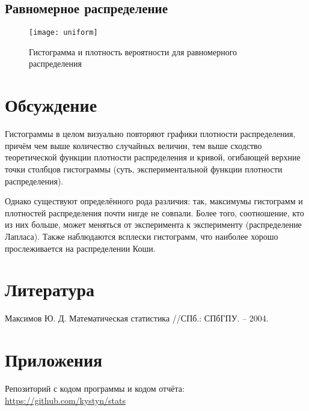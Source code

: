 \subsection{Равномерное распределение}
\begin{figure}[H]
	\begin{center}
		\texttt{[image: uniform]}
		\caption{Гистограмма и плотность вероятности для равномерного распределения} 
		\label{pic:pic_name}
	\end{center}
\end{figure}


\section{Обсуждение}
Гистограммы в целом визуально повторяют графики плотности распределения, причём чем выше количество случайных величин, тем выше сходство теоретической функции плотности распределения и кривой, огибающей верхние точки столбцов гистограммы (суть, экспериментальной функции плотности распределения).

Однако существуют определённого рода различия: так, максимумы гистограмм и плотностей распределения почти нигде не совпали. Более того, соотношение, кто из них больше, может меняться от эксперимента к эксперименту (распределение Лапласа). Также наблюдаются всплески гистограмм, что наиболее хорошо прослеживается на распределении Коши.



\section{Литература}
Максимов Ю. Д. Математическая статистика //СПб.: СПбГПУ. – 2004.

\section{Приложения}

Репозиторий с кодом программы и кодом отчёта: \href{https://github.com/kystyn/stats}{https://github.com/kystyn/stats}



